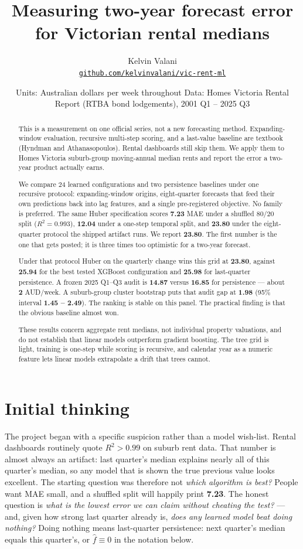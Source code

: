 \documentclass[11pt,a4paper]{article}
\title{Measuring two-year forecast error for Victorian rental medians}
\author{Kelvin Valani \\ \normalsize\href{https://github.com/kelvinvalani/vic-rent-ml}{\texttt{github.com/kelvinvalani/vic{-}rent{-}ml}}}
\date{\small Units: Australian dollars per week throughout \textperiodcentered{} Data: Homes Victoria Rental Report (RTBA bond lodgements), 2001 Q1 -- 2025 Q3}
\begin{document}
\maketitle

\begin{abstract}
This is a measurement on one official series, not a new forecasting method. Expanding-window evaluation, recursive multi-step scoring, and a last-value baseline are textbook (Hyndman and Athanasopoulos). Rental dashboards still skip them. We apply them to Homes Victoria suburb-group moving-annual median rents and report the error a two-year product actually earns.

We compare 24 learned configurations and two persistence baselines under one recursive protocol: expanding-window origins, eight-quarter forecasts that feed their own predictions back into lag features, and a single pre-registered objective. No family is preferred. The same Huber specification scores \textbf{7.23} MAE under a shuffled 80/20 split (\(R^2 = 0.993\)), \textbf{12.04} under a one-step temporal split, and \textbf{23.80} under the eight-quarter protocol the shipped artifact runs. We report \textbf{23.80}. The first number is the one that gets posted; it is three times too optimistic for a two-year forecast.

Under that protocol Huber on the quarterly change wins this grid at \textbf{23.80}, against \textbf{25.94} for the best tested XGBoost configuration and \textbf{25.98} for last-quarter persistence. A frozen 2025 Q1--Q3 audit is \textbf{14.87} versus \textbf{16.85} for persistence --- about \textbf{2} AUD/week. A suburb-group cluster bootstrap puts that audit gap at \textbf{1.98} (95\% interval \textbf{1.45 -- 2.49}). The ranking is stable on this panel. The practical finding is that the obvious baseline almost won.

These results concern aggregate rent medians, not individual property valuations, and do not establish that linear models outperform gradient boosting. The tree grid is light, training is one-step while scoring is recursive, and calendar year as a numeric feature lets linear models extrapolate a drift that trees cannot.
\end{abstract}

\section{Initial thinking}

The project began with a specific suspicion rather than a model wish-list. Rental dashboards routinely quote \(R^2 > 0.99\) on suburb rent data. That number is almost always an artifact: last quarter's median explains nearly all of this quarter's median, so any model that is shown the true previous value looks excellent. The starting question was therefore not \emph{which algorithm is best?} People want MAE small, and a shuffled split will happily print \textbf{7.23}. The honest question is \emph{what is the lowest error we can claim without cheating the test?} --- and, given how strong last quarter already is, \emph{does any learned model beat doing nothing?} Doing nothing means last-quarter persistence: next quarter's median equals this quarter's, or \(\hat f \equiv 0\) in the notation below.
\end{document}
